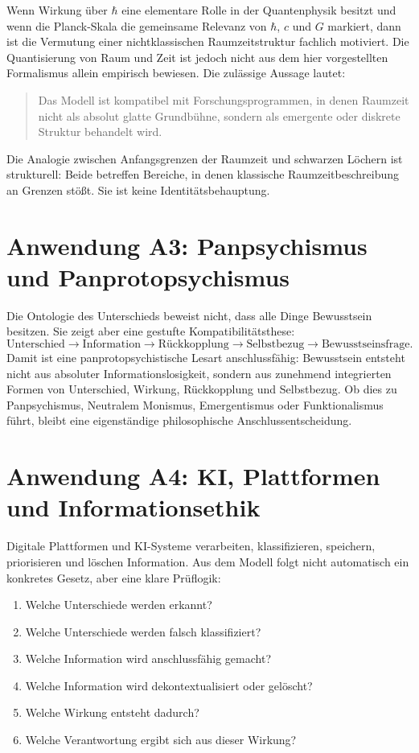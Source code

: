 \documentclass[11pt,a4paper]{article}
\theoremstyle{remark}
\begin{document}
Wenn Wirkung über $\hbar$ eine elementare Rolle in der Quantenphysik besitzt und wenn die Planck-Skala die gemeinsame Relevanz von $\hbar$, $c$ und $G$ markiert, dann ist die Vermutung einer nichtklassischen Raumzeitstruktur fachlich motiviert. Die Quantisierung von Raum und Zeit ist jedoch nicht aus dem hier vorgestellten Formalismus allein empirisch bewiesen. Die zulässige Aussage lautet:
\begin{quote}
Das Modell ist kompatibel mit Forschungsprogrammen, in denen Raumzeit nicht als absolut glatte Grundbühne, sondern als emergente oder diskrete Struktur behandelt wird.
\end{quote}

Die Analogie zwischen Anfangsgrenzen der Raumzeit und schwarzen Löchern ist strukturell: Beide betreffen Bereiche, in denen klassische Raumzeitbeschreibung an Grenzen stößt. Sie ist keine Identitätsbehauptung.

\section{Anwendung A3: Panpsychismus und Panprotopsychismus}

Die Ontologie des Unterschieds beweist nicht, dass alle Dinge Bewusstsein besitzen. Sie zeigt aber eine gestufte Kompatibilitätsthese:
\[
\text{Unterschied} \rightarrow \text{Information} \rightarrow \text{Rückkopplung} \rightarrow \text{Selbstbezug} \rightarrow \text{Bewusstseinsfrage}.
\]
Damit ist eine panprotopsychistische Lesart anschlussfähig: Bewusstsein entsteht nicht aus absoluter Informationslosigkeit, sondern aus zunehmend integrierten Formen von Unterschied, Wirkung, Rückkopplung und Selbstbezug. Ob dies zu Panpsychismus, Neutralem Monismus, Emergentismus oder Funktionalismus führt, bleibt eine eigenständige philosophische Anschlussentscheidung.

\section{Anwendung A4: KI, Plattformen und Informationsethik}

Digitale Plattformen und KI-Systeme verarbeiten, klassifizieren, speichern, priorisieren und löschen Information. Aus dem Modell folgt nicht automatisch ein konkretes Gesetz, aber eine klare Prüflogik:
\begin{enumerate}
    \item Welche Unterschiede werden erkannt?
    \item Welche Unterschiede werden falsch klassifiziert?
    \item Welche Information wird anschlussfähig gemacht?
    \item Welche Information wird dekontextualisiert oder gelöscht?
    \item Welche Wirkung entsteht dadurch?
    \item Welche Verantwortung ergibt sich aus dieser Wirkung?
\end{enumerate}
\end{document}
